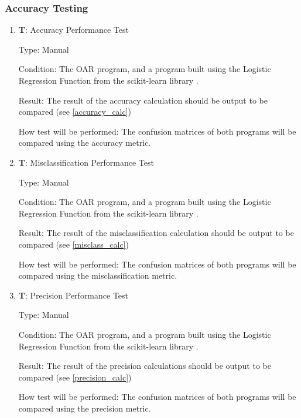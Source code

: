 \documentclass[12pt, titlepage]{article}
\newcounter{testnum} %
\begin{document}
\subsubsection{Accuracy Testing}

\begin{enumerate}

  \item{\textbf{T\thetestnum \label{T_accuracy}}: Accuracy Performance Test\\}

  Type: Manual
            
  Condition: The OAR program, and a program built
  using the Logistic Regression Function from the scikit-learn library \citep{SKLearn}.
            
  Result: The result of the accuracy calculation should be output to be compared (see \ref{accuracy_calc})
            
  How test will be performed: The confusion matrices of both programs will be compared using the accuracy metric.

  \item{\textbf{T\thetestnum \label{T_misclass}}: Misclassification Performance Test\\}

  Type: Manual
            
  Condition: The OAR program, and a program built
  using the Logistic Regression Function from the scikit-learn library \citep{SKLearn}.
            
  Result: The result of the misclassification calculation should be output to be compared (see \ref{misclass_calc})
            
  How test will be performed: The confusion matrices of both programs will be compared using the misclassification metric.

  \item{\textbf{T\thetestnum \label{T_precision}}: Precision Performance Test\\}

  Type: Manual
            
  Condition: The OAR program, and a program built
  using the Logistic Regression Function from the scikit-learn library \citep{SKLearn}.
            
  Result: The result of the precision calculations should be output to be compared (see \ref{precision_calc})
            
  How test will be performed: The confusion matrices of both programs will be compared using the precision metric.
\end{enumerate} 
					
\end{document}
